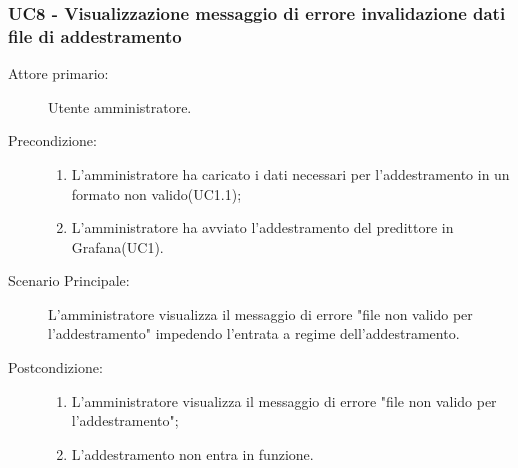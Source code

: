 \subsubsection{UC8 - Visualizzazione messaggio di errore invalidazione dati file di addestramento}
\label{sssec:uc8}
\begin{description}
	\item[Attore primario:] Utente amministratore.
	\item[Precondizione:]
	\begin{enumerate}
		\item L'amministratore ha caricato i dati necessari per l'addestramento in un formato non valido(UC1.1);
		\item L'amministratore ha avviato l'addestramento del predittore in Grafana(UC1).
	\end{enumerate}
	\item[Scenario Principale:] L'amministratore visualizza il messaggio di errore "file non valido per l'addestramento" impedendo l'entrata a regime dell'addestramento.
	\item[Postcondizione:]
	\begin{enumerate}
		\item L'amministratore visualizza il messaggio di errore "file non valido per l'addestramento";
		\item L'addestramento non entra in funzione.
	\end{enumerate}
\end{description}